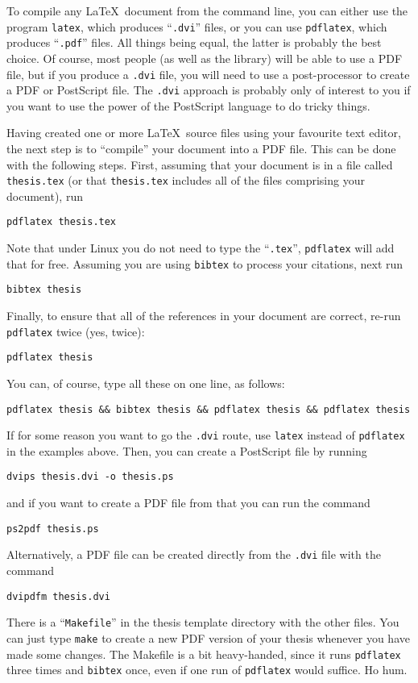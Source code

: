 To compile any \LaTeX\ document from the command line, you can either
use the program \verb|latex|, which produces ``\verb|.dvi|'' files, or
you can use \verb|pdflatex|, which produces ``\verb|.pdf|'' files.
All things being equal, the latter is probably the best choice.  Of
course, most people (as well as the library) will be able to use a PDF
file, but if you produce a \verb|.dvi| file, you will need to use a
post-processor to create a PDF or PostScript file.  The \verb|.dvi|
approach is probably only of interest to you if you want to use the
power of the PostScript language to do tricky things.

Having created one or more \LaTeX\ source files using your favourite
text editor, the next step is to ``compile'' your document into a
PDF file.  This can be done with the following steps.  First,
assuming that your document is in a file called \verb|thesis.tex| (or
that \verb|thesis.tex| includes all of the files comprising your
document), run

\verb|pdflatex thesis.tex|

\noindent
Note that under Linux you do not need to type the ``\verb|.tex|'',
\verb|pdflatex| will add that for free.  Assuming you are using
\verb|bibtex| to process your citations, next run

\verb|bibtex thesis|

\noindent
Finally, to ensure that all of the references in your document are
correct, re-run \verb|pdflatex| twice (yes, twice):

\verb|pdflatex thesis|

\noindent
You can, of course, type all these on one line, as follows:

\verb|pdflatex thesis && bibtex thesis && pdflatex thesis && pdflatex thesis|

\noindent
If for some reason you want to go the \verb|.dvi| route, use
\verb|latex| instead of \verb|pdflatex| in the examples above.
Then, you can create a PostScript file by running

\verb|dvips thesis.dvi -o thesis.ps|

\noindent
and if you want to create a PDF file from that you can run the
command

\verb|ps2pdf thesis.ps|

\noindent
Alternatively, a PDF file can be created directly from the \verb|.dvi|
file with the command

\verb|dvipdfm thesis.dvi|

\smallskip
There is a ``\verb|Makefile|'' in the thesis template directory with
the other files.  You can just type \verb|make| to create a new PDF
version of your thesis whenever you have made some changes.  The
Makefile is a bit heavy-handed, since it runs \verb|pdflatex| three
times and \verb|bibtex| once, even if one run of \verb|pdflatex| would
suffice.  Ho hum.

